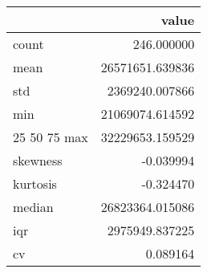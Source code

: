 \begin{tabular}{lr}
\toprule
 & value \\
\midrule
count & 246.000000 \\
mean & 26571651.639836 \\
std & 2369240.007866 \\
min & 21069074.614592 \\
25%
50%
75%
max & 32229653.159529 \\
skewness & -0.039994 \\
kurtosis & -0.324470 \\
median & 26823364.015086 \\
iqr & 2975949.837225 \\
cv & 0.089164 \\
\bottomrule
\end{tabular}
